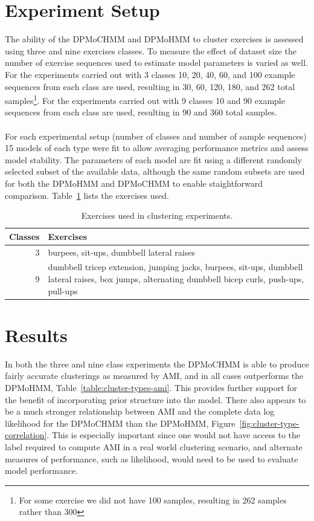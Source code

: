 \documentclass[12pt]{report}
\newcommand{\1}[0]{\mathbbm{1}}
\begin{document}
\section{Experiment Setup}
The ability of the \ac{DPMoCHMM} and \ac{DPMoHMM} to cluster exercises is assessed
using three and nine exercises classes. To measure the effect of dataset size the number of
exercise sequences used to estimate model parameters is varied as well. For the experiments
carried out with 3 classes 10, 20, 40, 60, and 100 example sequences from each class are used,
resulting in 30, 60, 120, 180, and 262 total samples\footnote{For some exercise we did not
have 100 samples, resulting in 262 samples rather than 300}. For the experiments carried out with
9 classes 10 and 90 example sequences from each class are used, resulting in 90 and 360 total samples.
\\\\
For each experimental setup (number of classes and number of sample sequences)
15 models of each type were fit to allow averaging performance metrics and assess model stability.
The parameters of each model are fit using a different randomly selected subset of the available data,
although the same random subsets are used for both the \ac{DPMoHMM} and \ac{DPMoCHMM} to enable
staightforward comparison. Table~\ref{table:cluster-experiment} lists the exercises used.

\begin{table}[H]
    \centering
    \begin{tabular}{r | p{8cm}}\hline
    \textbf{Classes} & \textbf{Exercises} \\\hline
    3 &  burpees, sit-ups, dumbbell lateral raises\\\hline
    9 & dumbbell tricep extension, jumping jacks, burpees, sit-ups, dumbbell lateral raises, box jumps, alternating dumbbell bicep curls, push-ups, pull-ups\\
    \end{tabular}
    \caption[Exercises used in clustering experiments]{
        Exercises used in clustering experiments.
    }
    \label{table:cluster-experiment}
\end{table}

\section{Results}
In both the three and nine class experiments the \ac{DPMoCHMM}
is able to produce fairly accurate clusterings as measured by
\ac{AMI}, and in all cases outperforms the \ac{DPMoHMM}, Table~\ref{table:cluster-types-ami}.
This provides further support for the benefit of incorporating prior
structure into the model. There also appears to be a much stronger
relationship between \ac{AMI} and the complete data log likelihood for the
\ac{DPMoCHMM} than the \ac{DPMoHMM}, Figure~\ref{fig:cluster-type-correlation}.
This is especially important since one would not have access to the label required
to compute \ac{AMI} in a real world clustering scenario, and alternate measures of performance,
such as likelihood, would need to be used to evaluate model performance.
\end{document}
